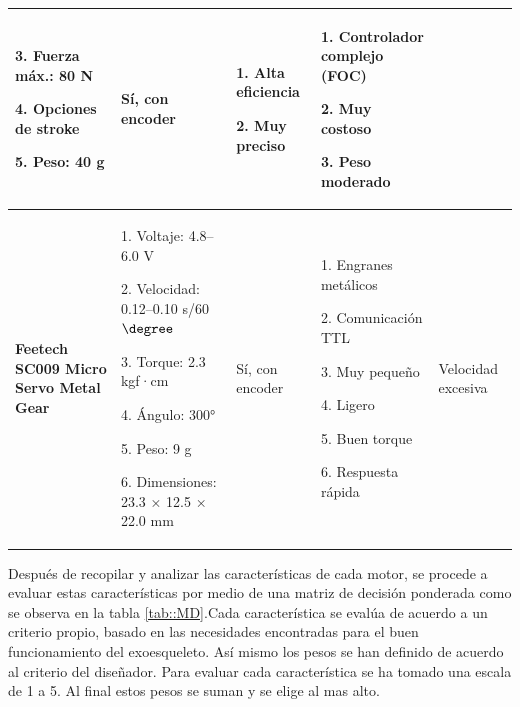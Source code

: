 \begin{longtable}{|p{2.5cm}|p{3.0cm}|p{2.0cm}|p{4.0cm}|p{4.0cm}|}
  3. Fuerza máx.: 80 N 
  
  4. Opciones de stroke 
  
  5. Peso: 40 g
& Sí, con encoder
& 1. Alta eficiencia 

  2. Muy preciso
& 1. Controlador complejo (FOC) 

  2. Muy costoso 
  
  3. Peso moderado \\ \hline

\textbf{Feetech SC009 Micro Servo Metal Gear\cite{aliexpress_1005009157922082}}
& 1. Voltaje: 4.8–6.0 V 

  2. Velocidad: 0.12–0.10 s/60$\degree$
  
  3. Torque: 2.3 kgf·cm 
  
  4. Ángulo: 300° 
  
  5. Peso: 9 g 
  
  6. Dimensiones: 23.3 × 12.5 × 22.0 mm
& Sí, con encoder
& 1. Engranes metálicos 

  2. Comunicación TTL 
  
  3. Muy pequeño 
  
  4. Ligero 
  
  5. Buen torque 
  
  6. Respuesta rápida
&  Velocidad excesiva \\ \hline

\end{longtable}


Después de recopilar y analizar las características de cada motor, se procede a evaluar estas características por medio de una matriz de decisión ponderada como se observa en la tabla \ref{tab::MD}.Cada característica se evalúa de acuerdo a un criterio propio, basado en las necesidades encontradas para el buen funcionamiento del exoesqueleto. Así mismo los pesos se han definido de acuerdo al criterio del diseñador. Para evaluar cada característica se ha tomado una escala de 1 a 5. Al final estos pesos se suman y se elige al mas alto.




